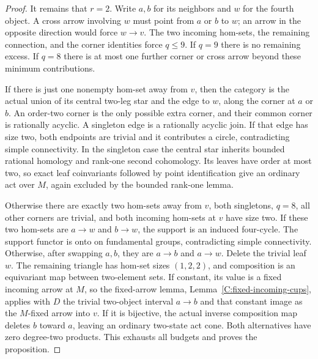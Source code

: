 \begin{proof}
It remains that $r=2$. Write $a,b$ for its neighbors and
$w$ for the fourth object. A cross arrow involving $w$
must point from $a$ or $b$ to $w$; an arrow in the opposite
direction would force $w\to v$. The two incoming hom-sets,
the remaining connection, and the corner identities force
$q\leq9$. If $q=9$ there is no remaining excess. If $q=8$
there is at most one further corner or cross arrow beyond
these minimum contributions.

If there is just one nonempty hom-set away from $v$, then
the category is the actual union of its central two-leg star
and the edge to $w$, along the corner at $a$ or $b$.
An order-two corner is the only possible extra corner, and
their common corner is rationally acyclic. A singleton edge
is a rationally acyclic join. If that edge has size two,
both endpoints are trivial and it contributes a circle,
contradicting simple connectivity. In the singleton case
the central star inherits bounded rational homology and
rank-one second cohomology. Its leaves have order at most
two, so exact leaf coinvariants followed by point identification
give an ordinary act over $M$, again excluded by the bounded
rank-one lemma.

Otherwise there are exactly two hom-sets away from $v$,
both singletons, $q=8$, all other corners are trivial,
and both incoming hom-sets at $v$ have size two.
If these two hom-sets are $a\to w$ and $b\to w$, the
support is an induced four-cycle. The support functor is
onto on fundamental groups, contradicting simple connectivity.
Otherwise, after swapping $a,b$, they are $a\to b$ and
$a\to w$. Delete the trivial leaf $w$. The remaining
triangle has hom-set sizes $(1,2,2)$, and composition is
an equivariant map between two-element sets. If constant,
its value is a fixed incoming arrow at $M$, so the fixed-arrow
lemma, Lemma~\ref{C:fixed-incoming-cups}, applies with $D$
the trivial two-object interval $a\to b$ and that constant
image as the $M$-fixed arrow into $v$. If it is
bijective, the actual inverse composition map deletes $b$
toward $a$, leaving an ordinary two-state act cone.
Both alternatives have zero degree-two products.
This exhausts all budgets and proves the proposition.
\end{proof}

